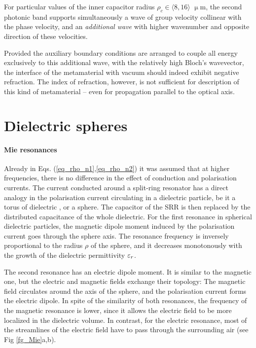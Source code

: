 For particular values of the inner capacitor radius $\rho_c \in \langle8,16\rangle$ $\upmu$m, the second photonic band supports simultaneously a wave of group velocity collinear with the phase velocity, and an \textit{additional wave} with higher wavenumber and opposite direction of these velocities. 

Provided the auxiliary boundary conditions are arranged to couple all energy exclusively to this additional wave, with the relatively high Bloch's wavevector, the interface of the metamaterial with vacuum should indeed exhibit negative refraction. The index of refraction, however, is not sufficient for description of this kind of metamaterial -- even for propagation parallel to the optical axis.

\FloatBarrier %
\section{Dielectric spheres} %
\paragraph{Mie resonances}%
Already in Eqs. (\ref{eq_rho_n1},\ref{eq_rho_n2}) it was assumed that at higher frequencies, there is no difference in the effect of conduction and polarisation currents. The current conducted around a split-ring resonator has a direct analogy in the polarisation current circulating in a dielectric particle, be it a torus of dielectric \cite{jelinek2009artificial}, or a sphere. The capacitor of the SRR is then replaced by the distributed capacitance of the whole dielectric. For the first resonance in spherical dielectric particles, the magnetic dipole moment induced by the polarisation current goes through the sphere axis. The resonance frequency is inversely proportional to the radius $\rho$ of the sphere, and it decreases monotonously with the growth of the dielectric permittivity $\varepsilon_r$.

The second resonance has an electric dipole moment. It is similar to the magnetic one, but the electric and magnetic fields exchange their topology: The magnetic field circulates around the axis of the sphere, and the polarisation current forms the electric dipole. In spite of the similarity of both resonances, the frequency of the magnetic resonance is lower, since it allows the electric field to be more localized in the dielectric volume. In contrast, for the electric resonance, most of the streamlines of the electric field have to pass through the surrounding air (see Fig \ref{fg_Mie}a,b).  %

